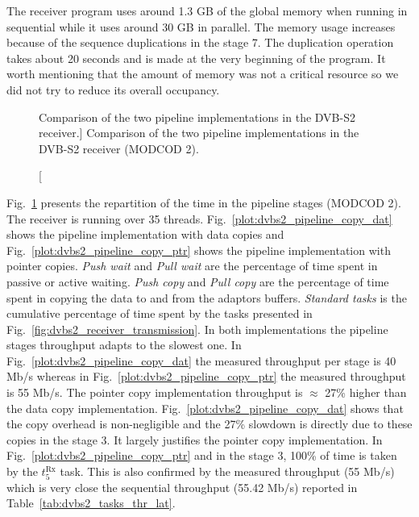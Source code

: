 The receiver program uses around 1.3 GB of the global memory when running in
sequential while it uses around 30 GB in parallel. The memory usage increases
because of the sequence duplications in the stage 7. The duplication operation
takes about 20 seconds and is made at the very beginning of the program. It
worth mentioning that the amount of memory was not a critical resource so we
did not try to reduce its overall occupancy.

\begin{figure}[htp]
  \centering
  \quad
  \caption
    [Comparison of the two pipeline implementations in the DVB-S2
     receiver.]
    {Comparison of the two pipeline implementations in the DVB-S2 receiver
     (MODCOD 2).}
  \label{plot:dvbs2_pipeline}
\end{figure}

Fig.~\ref{plot:dvbs2_pipeline} presents the repartition of the time in the
pipeline stages (MODCOD 2). The receiver is running over 35 threads.
Fig.~\ref{plot:dvbs2_pipeline_copy_dat} shows the pipeline implementation with
data copies and Fig.~\ref{plot:dvbs2_pipeline_copy_ptr} shows the pipeline
implementation with pointer copies. \emph{Push wait} and \emph{Pull wait} are
the percentage of time spent in passive or active waiting. \emph{Push copy} and
\emph{Pull copy} are the percentage of time spent in copying the data to and
from the adaptors buffers. \emph{Standard tasks} is the cumulative percentage of
time spent by the tasks presented in Fig.~\ref{fig:dvbs2_receiver_transmission}.
In both implementations the pipeline stages throughput adapts to the slowest
one. In Fig.~\ref{plot:dvbs2_pipeline_copy_dat} the measured throughput per
stage is 40 Mb/s whereas in Fig.~\ref{plot:dvbs2_pipeline_copy_ptr} the measured
throughput is 55 Mb/s. The pointer copy implementation throughput is $\approx$
27\% higher than the data copy implementation.
Fig.~\ref{plot:dvbs2_pipeline_copy_dat} shows that the copy overhead is
non-negligible and the 27\% slowdown is directly due to these copies in the
stage 3. It largely justifies the pointer copy implementation. In
Fig.~\ref{plot:dvbs2_pipeline_copy_ptr} and in the stage 3, 100\% of time is
taken by the $t^\text{Rx}_{5}$ task. This is also confirmed by the measured
throughput (55 Mb/s) which is very close the sequential throughput (55.42
Mb/s) reported in Table~\ref{tab:dvbs2_tasks_thr_lat}.

